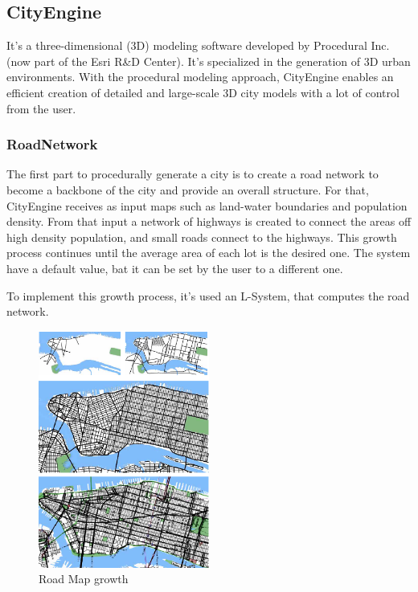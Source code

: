 \subsection{CityEngine \cite{Parish2001} \cite{Muller2006}}
\label{sub:cityengine}

It's a three-dimensional (3D) modeling software developed by Procedural Inc. (now part of the Esri R&D Center). It's specialized in the generation of 3D urban environments. With the procedural modeling approach, CityEngine enables an efficient creation of detailed and large-scale 3D city models with a lot of control from the user. 

\subsubsection{RoadNetwork} %
\label{ssub:roadnetwork1}


The first part to procedurally generate a city is to create a road network to become a backbone of the city and provide an overall structure. For that, CityEngine receives as input maps such as land-water boundaries and population
density. From that input a network of highways is created to connect the areas off high density population, and small roads connect to the highways.
This growth process continues until the average area of each lot is the desired one. The system have a default value, bat it can be set by the user to a different one.

To implement this growth process, it's used an L-System, that computes the road network.


\begin{figure}[htbp]
  \centering
  \includegraphics[width=0.5\textwidth]{img/Procedural-Modeling-of-Cities/Capturar.png}
  \caption{Road Map growth}
  \label{fig:city}
\end{figure}

